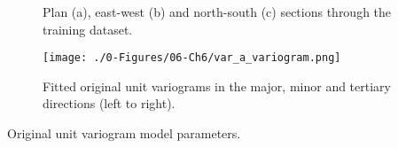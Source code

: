 


\begin{figure}
    \centering
    \tabskip=0pt
    \caption{Plan (a), east-west (b) and north-south (c) sections through the training dataset.}
    \label{fig:train_data}
\end{figure}

\begin{figure}[htb!]
    \centering
    \texttt{[image: ./0-Figures/06-Ch6/var\_a\_variogram.png]}
    \caption{Fitted original unit variograms in the major, minor and tertiary directions (left to right). }
    \label{fig:orig_expvar}
\end{figure}

\begin{table}[!htb]
    \centering
    \caption{Original unit variogram model parameters.}
    \resizebox{1\width}{!}{}
    \label{tab:orig_expvar}
\end{table}

